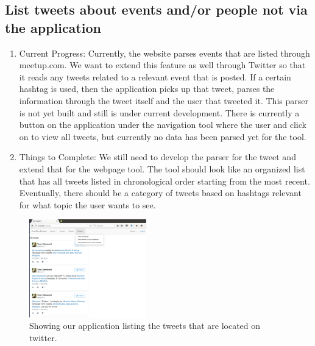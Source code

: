 \documentclass[letterpaper,10pt,onecolumn]{IEEEtran} %
\begin{document}
\subsection{List tweets about events and/or people not via the application}
\begin{enumerate}[label*=\arabic*.]
\item Current Progress: Currently, the website parses events that are listed through meetup.com. We want to extend this feature as well through Twitter so that it reads any tweets related to a relevant event that is posted. If a certain hashtag is used, then the application picks up that tweet, parses the information through the tweet itself and the user that tweeted it. This parser is not yet built and still is under current development. There is currently a button on the application under the navigation tool where the user and click on to view all tweets, but currently no data has been parsed yet for the tool.

\item Things to Complete: We still need to develop the parser for the tweet and extend that for the webpage tool. The tool should look like an organized list that has all tweets listed in chronological order starting from the most recent. Eventually, there should be a category of tweets based on hashtags relevant for what topic the user wants to see.
\end{enumerate}

\begin{figure}[htp]
  \begin{center}
  
  \includegraphics[width=2in]{listingTweets}
  \centering
  \caption{Showing our application listing the tweets that are located on twitter. }

  \end{center}
\end{figure}
\end{document}
